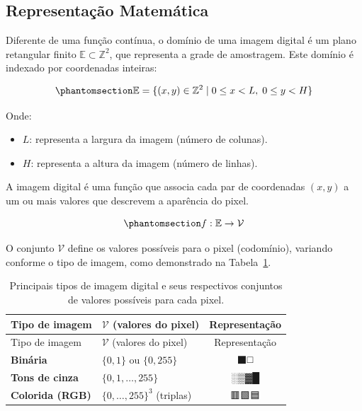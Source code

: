 \documentclass[
  portuguese,
  letterpaper,
  openany,
  oneside,
  12pt,
  a4paper]{book}
\providecommand{\tightlist}{%
  \setlength{\itemsep}{0pt}\setlength{\parskip}{0pt}}
\begin{document}
\subsection*{Representação
Matemática}\label{representauxe7uxe3o-matemuxe1tica}

Diferente de uma função contínua, o domínio de uma imagem digital é um
plano retangular finito \(\mathbb{E} \subset \mathbb{Z}^2\), que
representa a grade de amostragem. Este domínio é indexado por
coordenadas inteiras:

\begin{equation}\phantomsection\label{eq-1-dominio}{
\mathbb{E}  = \{ (x, y) \in \mathbb{Z}^2 \mid 0 \le x < L,\; 0 \le y < H \}
}\end{equation}

Onde:

\begin{itemize}
\tightlist
\item
  \textbf{\(L\)}: representa a largura da imagem (número de colunas).
\item
  \textbf{\(H\)}: representa a altura da imagem (número de linhas).
\end{itemize}

A imagem digital é uma função que associa cada par de coordenadas
\((x,y)\) a um ou mais valores que descrevem a aparência do pixel.

\begin{equation}\phantomsection\label{eq-1-image}{
f: \mathbb{E}  \to \mathcal{V}
}\end{equation}

O conjunto \(\mathcal{V}\) define os valores possíveis para o pixel
(codomínio), variando conforme o tipo de imagem, como demonstrado na
Tabela~\ref{tbl-1-tipos-imagem}.

\begin{longtable}[]{@{}llc@{}}
\caption{Principais tipos de imagem digital e seus respectivos conjuntos
de valores possíveis para cada
pixel.}\label{tbl-1-tipos-imagem}\tabularnewline
\toprule\noalign{}
Tipo de imagem & \(\mathcal{V}\) (valores do pixel) & Representação \\
\midrule\noalign{}
\endfirsthead
\toprule\noalign{}
Tipo de imagem & \(\mathcal{V}\) (valores do pixel) & Representação \\
\midrule\noalign{}
\endhead
\bottomrule\noalign{}
\endlastfoot
\textbf{Binária} & \(\{0, 1\}\) ou \(\{0, 255\}\) & ⬛◻️ \\
\textbf{Tons de cinza} & \(\{0, 1, \dots, 255\}\) & ░▒▓█ \\
\textbf{Colorida (RGB)} & \(\{0, \dots, 255\}^3\) (triplas) & 🟥🟩🟦 \\
\end{longtable}
\end{document}
